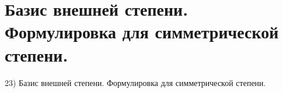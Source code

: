 \section{
 Базис внешней степени. Формулировка для симметрической степени.
}

23) Базис внешней степени. Формулировка для симметрической степени.
